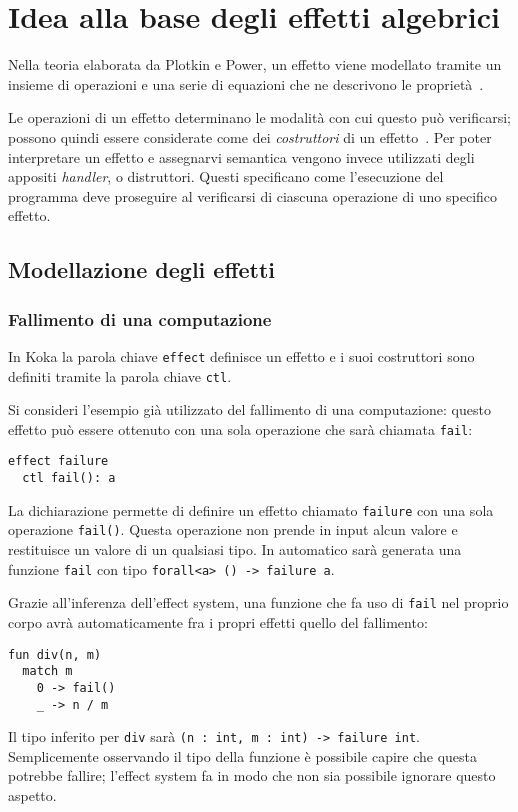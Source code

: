 \section{Idea alla base degli effetti algebrici}

Nella teoria elaborata da Plotkin e Power, un effetto viene modellato tramite un insieme di operazioni e una serie di equazioni che ne descrivono le proprietà~\cite{cit:handling-algebraic-effects,cit:computational-effects-and-operations-an-overview}.

Le operazioni di un effetto determinano le modalità con cui questo può verificarsi; possono quindi essere considerate come dei \emph{costruttori} di un effetto~\cite{cit:algebraic-operations-and-generic-effects}.
Per poter interpretare un effetto e assegnarvi semantica vengono invece utilizzati degli appositi \emph{handler}, o distruttori. Questi specificano come l'esecuzione del programma deve proseguire al verificarsi di ciascuna operazione di uno specifico effetto.

\subsection{Modellazione degli effetti}
\subsubsection{Fallimento di una computazione}
In Koka la parola chiave \lstinline{effect} definisce un effetto e i suoi costruttori sono definiti tramite la parola chiave \lstinline{ctl}.

Si consideri l'esempio già utilizzato del fallimento di una computazione: questo effetto può essere ottenuto con una sola operazione che sarà chiamata \lstinline{fail}:
\begin{lstlisting}[language=koka]
effect failure
  ctl fail(): a
\end{lstlisting}
La dichiarazione permette di definire un effetto chiamato \lstinline{failure} con una sola operazione \lstinline{fail()}. Questa operazione non prende in input alcun valore e restituisce un valore di un qualsiasi tipo. In automatico sarà generata una funzione \lstinline{fail} con tipo \lstinline{forall<a> () -> failure a}.

Grazie all'inferenza dell'effect system, una funzione che fa uso di \lstinline{fail} nel proprio corpo avrà automaticamente fra i propri effetti quello del fallimento:
\begin{lstlisting}[language=koka]
fun div(n, m)
  match m
    0 -> fail()
    _ -> n / m
\end{lstlisting}
Il tipo inferito per \lstinline{div} sarà \lstinline{(n : int, m : int) -> failure int}. Semplicemente osservando il tipo della funzione è possibile capire che questa potrebbe fallire; l'effect system fa in modo che non sia possibile ignorare questo aspetto.

